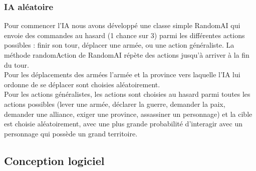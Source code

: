 \documentclass[a4paper,12pt]{article}
\begin{document}
\subsubsection{IA aléatoire}
Pour commencer l'IA nous avons développé une classe simple RandomAI qui envoie des commandes au hasard (1 chance sur 3) parmi les différentes actions possibles : finir son tour, déplacer une armée, ou une action généraliste. La méthode randomAction de RandomAI répète des actions jusqu'à arriver à la fin du tour.\\

Pour les déplacements des armées l'armée et la province vers laquelle l'IA lui ordonne de se déplacer sont choisies aléatoirement.\\

Pour les actions généralistes, les actions sont choisies au hasard parmi toutes les actions possibles (lever une armée, déclarer la guerre, demander la paix, demander une alliance, exiger une province, assassiner un personnage) et la cible est choisie aléatoirement, avec une plus grande probabilité d'interagir avec un personnage qui possède un grand territoire.\\

\clearpage
\subsection{Conception logiciel}
\end{document}
